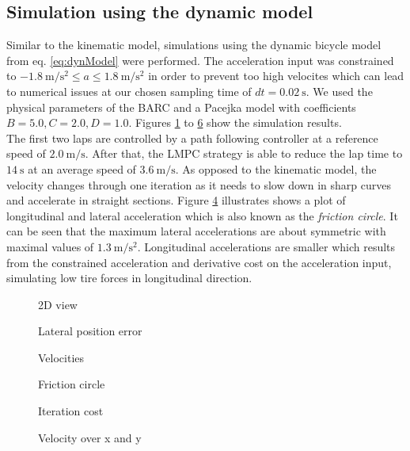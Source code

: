 \subsection{Simulation using the dynamic model}
Similar to the kinematic model, simulations using the dynamic bicycle model from eq. \ref{eq:dynModel} were performed. The acceleration input was constrained to $-\SI{1.8}{\meter\per\square\second}\leq a \leq \SI{1.8}{\meter\per\square\second}$ in order to prevent too high velocites which can lead to numerical issues at our chosen sampling time of $dt=\SI{0.02}{\second}$. We used the physical parameters of the BARC and a Pacejka model with coefficients $B=5.0, C=2.0, D = 1.0$. Figures \ref{fig:SimDyn_xy} to \ref{fig:SimDyn_v_over_xy} show the simulation results.\\
The first two laps are controlled by a path following controller at a reference speed of $\SI{2.0}{\meter\per\second}$. After that, the LMPC strategy is able to reduce the lap time to $\SI{14}{\second}$ at an average speed of $\SI{3.6}{\meter\per\second}$.
As opposed to the kinematic model, the velocity changes through one iteration as it needs to slow down in sharp curves and accelerate in straight sections.
Figure \ref{fig:SimDyn_fcircle} illustrates shows a plot of longitudinal and lateral acceleration which is also known as the \emph{friction circle}. It can be seen that the maximum lateral accelerations are about symmetric with maximal values of $\SI{1.3}{\meter\per\square\second}$. Longitudinal accelerations are smaller which results from the constrained acceleration and derivative cost on the acceleration input, simulating low tire forces in longitudinal direction.
\begin{figure}[ht]
	\centering
  	
	\caption{2D view}
	\label{fig:SimDyn_xy}
\end{figure}

\begin{figure}[ht]
	\centering
  	
	\caption{Lateral position error}
	\label{fig:SimDyn_eY}
\end{figure}

\begin{figure}[ht]
	\centering
  	
	\caption{Velocities}
	\label{fig:SimDyn_v}
\end{figure}

\begin{figure}[ht]
	\centering
  	
	\caption{Friction circle}
	\label{fig:SimDyn_fcircle}
\end{figure}

\begin{figure}[ht]
	\centering
  	
	\caption{Iteration cost}
	\label{fig:SimDyn_cost}
\end{figure}

\begin{figure}[ht]
	\centering
  	
	\caption{Velocity over x and y}
	\label{fig:SimDyn_v_over_xy}
\end{figure}
